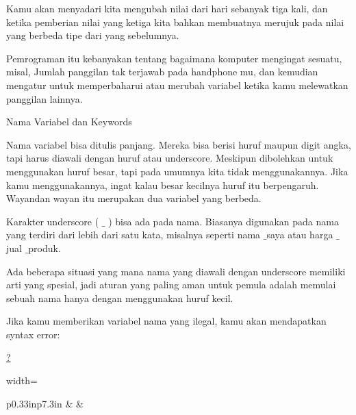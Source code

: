 \vspace{12pt}
\noindent 
Kamu akan menyadari kita mengubah nilai dari $  $hari $  $sebanyak tiga kali, dan ketika pemberian nilai yang ketiga kita bahkan membuatnya merujuk pada nilai yang berbeda tipe dari yang sebelumnya. \par
\vspace{12pt}
\noindent 
Pemrograman itu kebanyakan tentang bagaimana komputer mengingat sesuatu, misal, $  $Jumlah panggilan tak terjawab pada handphone mu, $  $dan kemudian mengatur untuk memperbaharui atau merubah variabel ketika kamu melewatkan panggilan lainnya. \par
\vspace{12pt}
\noindent 
 Nama Variabel dan Keywords \par
\vspace{12pt}
\noindent 
Nama variabel $  $bisa ditulis panjang. Mereka bisa berisi huruf maupun digit angka, tapi harus diawali dengan huruf atau underscore. Meskipun dibolehkan untuk menggunakan huruf besar, tapi pada umumnya kita tidak menggunakannya. Jika kamu menggunakannya, ingat kalau besar kecilnya huruf itu berpengaruh. $  $Wayandan $  $wayan $  $itu merupakan dua variabel yang berbeda. \par
\vspace{12pt}
\noindent 
Karakter underscore (  $  \_  $ ) bisa ada pada nama. Biasanya digunakan pada nama yang terdiri dari lebih dari satu kata, misalnya seperti $  $nama $  \_  $saya $  $atau $  $harga $  \_  $jual $  \_  $produk. \par
\vspace{12pt}
\noindent 
Ada beberapa situasi yang mana nama yang diawali dengan underscore memiliki arti yang spesial, jadi aturan yang paling aman untuk pemula adalah memulai sebuah nama hanya dengan menggunakan huruf kecil. \par
\vspace{12pt}
\noindent 
Jika kamu memberikan variabel nama yang ilegal, kamu akan mendapatkan syntax error: \par
\noindent 
\href{https://tutorkeren.com/artikel/python-3-rle-bab-2-variabel-ekspresi-dan-pernyataan.htm}{?}
 \par




\begin{table}[H]
\centering
\begin{adjustbox}{width=\textwidth}
\begin{tabular}{ p{0.33in}p{7.3in} }
\hhline{--}
 &  & \hline
\end{tabular}
\end{adjustbox}
\end{table}


